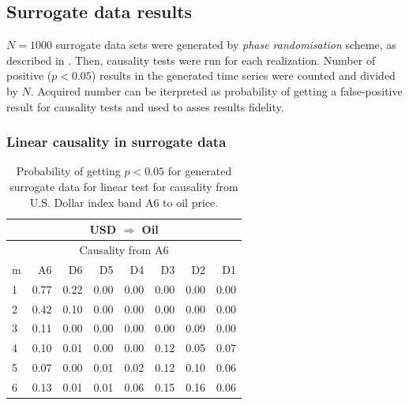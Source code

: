 \subsection{Surrogate data results}

$N=1000$ surrogate data sets were generated by \emph{phase randomisation} scheme, as described in .
Then, causality tests were run for each realization.
Number of positive ($p < 0.05$) results in the generated time series were counted and divided by $N$.
Acquired number can be iterpreted as probability of getting a false-positive result for causality tests and used to asses results fidelity.

\subsubsection{Linear causality in surrogate data}

%
%
\begin{table}[H]
\begin{center}
\begin{tabular}{l|r r r r r r r}
\hline\hline
\multicolumn{8}{c}{USD $\Rightarrow$ Oil}\\
\hline
\multicolumn{8}{c}{Causality from A6}\\
\hline\hline
m & A6 & D6 & D5 & D4 & D3 & D2 & D1 \\
\hline
1 & 0.77 & 0.22 & 0.00 & 0.00 & 0.00 & 0.00 & 0.00 \\
2 & 0.42 & 0.10 & 0.00 & 0.00 & 0.00 & 0.00 & 0.00 \\
3 & 0.11 & 0.00 & 0.00 & 0.00 & 0.00 & 0.09 & 0.00 \\
4 & 0.10 & 0.01 & 0.00 & 0.00 & 0.12 & 0.05 & 0.07 \\
5 & 0.07 & 0.00 & 0.01 & 0.02 & 0.12 & 0.10 & 0.06 \\
6 & 0.13 & 0.01 & 0.01 & 0.06 & 0.15 & 0.16 & 0.06 \\
\hline\hline
\end{tabular}
\caption{Probability of getting $p < 0.05$ for generated surrogate data for linear test for causality from U.S. Dollar index band A6 to oil price.}
\end{center}
\end{table}

